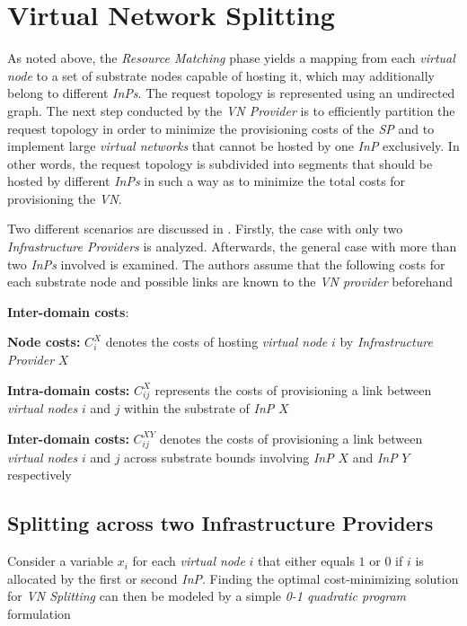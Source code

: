 \documentclass[prodmode,acmtomccap]{acmlarge}
\begin{document}
\section{Virtual Network Splitting}
\label{sec:splitting}
As noted above, the \emph{Resource Matching} phase yields a mapping from each \emph{virtual node} to a set of substrate nodes capable of hosting it, which may additionally belong to different \emph{InPs}.
The request topology is represented using an undirected graph. 
The next step conducted by the \emph{VN Provider} is to efficiently partition the request topology in order to minimize the provisioning costs of the \emph{SP} and to implement large \emph{virtual networks}
that cannot be hosted by one \emph{InP} exclusively. In other words, the request topology is subdivided into segments that should be hosted by different \emph{InPs} in such a way as to
minimize the total costs for provisioning the \emph{VN}.

Two different scenarios are discussed in . Firstly, the case with only two \emph{Infrastructure Providers} is analyzed. Afterwards, the general case with more than two \emph{InPs} involved
is examined. The authors assume that the following costs for each substrate node and possible links are known to the \emph{VN provider} beforehand

\begin{describe}{{\bfseries Inter-domain costs\/}:}
	\item[\bfseries Node costs:] $C_i^X$ denotes the costs of hosting \emph{virtual node} $i$ by \emph{Infrastructure Provider} $X$ 
	\item[\bfseries Intra-domain costs:] $C_{ij}^X$ represents the costs of provisioning a link between \emph{virtual nodes} $i$ and $j$ within the substrate of \emph{InP} $X$ 
	\item[\bfseries Inter-domain costs:] $C_{ij}^{XY}$ denotes the costs of provisioning a link between \emph{virtual nodes} $i$ and $j$ across substrate bounds involving \emph{InP} $X$ and \emph{InP} $Y$ respectively	
\end{describe}

\subsection{Splitting across two Infrastructure Providers}
Consider a variable $x_i$ for each \emph{virtual node} $i$ that either equals $1$ or $0$ if $i$ is allocated by the first or second \emph{InP}. Finding the optimal cost-minimizing solution for
\emph{VN Splitting} can then be modeled by a simple \emph{0-1 quadratic program} formulation
\end{document}
